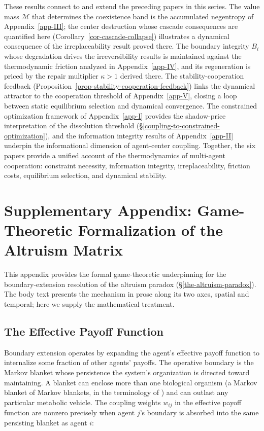\documentclass[11pt]{article}
\theoremstyle{plain}
\theoremstyle{definition}
\theoremstyle{remark}
\let\origsection\section
\renewcommand{\section}{\needspace{12\baselineskip}\origsection}
\let\origsubsection\subsection
\renewcommand{\subsection}{\needspace{7\baselineskip}\origsubsection}
\begin{document}
These results connect to and extend the preceding papers in this series.
The value mass \(\mathcal{M}\) that determines the coexistence band is
the accumulated negentropy of Appendix~\ref{app-III}; the center
destruction whose cascade consequences are quantified here
(Corollary~\ref{cor-cascade-collapse}) illustrates a dynamical
consequence of the irreplaceability result proved there. The boundary
integrity \(B_i\) whose degradation drives the irreversibility results
is maintained against the thermodynamic friction analyzed in
Appendix~\ref{app-IV}, and its regeneration is priced by the repair
multiplier \(\kappa > 1\) derived there. The stability-cooperation
feedback (Proposition~\ref{prop-stability-cooperation-feedback}) links
the dynamical attractor to the cooperation threshold of
Appendix~\ref{app-V}, closing a loop between static equilibrium
selection and dynamical convergence. The constrained optimization
framework of Appendix~\ref{app-I} provides the shadow-price
interpretation of the dissolution threshold
(§\ref{coupling-to-constrained-optimization}), and the information
integrity results of Appendix~\ref{app-II} underpin the informational
dimension of agent-center coupling. Together, the six papers provide a
unified account of the thermodynamics of multi-agent cooperation:
constraint necessity, information integrity, irreplaceability, friction
costs, equilibrium selection, and dynamical stability.

\newpage

\section{Supplementary Appendix: Game-Theoretic Formalization of the
Altruism
Matrix}\label{supplementary-appendix-game-theoretic-formalization-of-the-altruism-matrix}

This appendix provides the formal game-theoretic underpinning for the
boundary-extension resolution of the altruism paradox
(§\ref{the-altruism-paradox}). The body text presents the mechanism in
prose along its two axes, spatial and temporal; here we supply the
mathematical treatment.

\subsection{The Effective Payoff
Function}\label{the-effective-payoff-function}

Boundary extension operates by expanding the agent's effective payoff
function to internalize some fraction of other agents' payoffs. The
operative boundary is the Markov blanket
\citep{Pearl2000, KirchhoffFriston2018} whose persistence the system's
organization is directed toward maintaining. A blanket can enclose more
than one biological organism (a Markov blanket of Markov blankets, in
the terminology of \citet{KirchhoffFriston2018}) and can outlast any
particular metabolic vehicle. The coupling weights \(w_{ij}\) in the
effective payoff function are nonzero precisely when agent \(j\)'s
boundary is absorbed into the same persisting blanket as agent \(i\):
\end{document}
